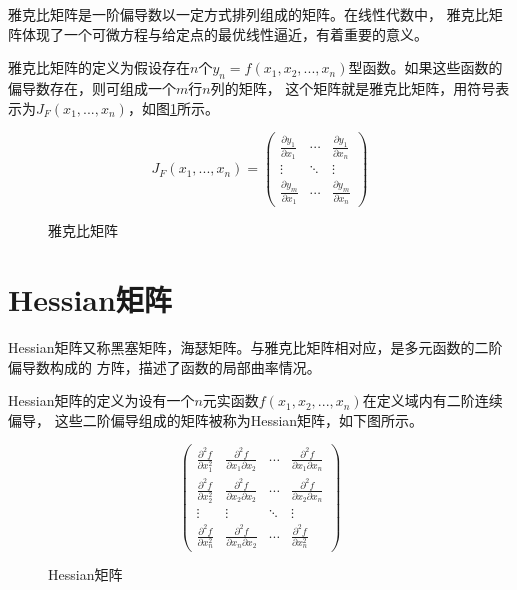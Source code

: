 雅克比矩阵是一阶偏导数以一定方式排列组成的矩阵。在线性代数中，
雅克比矩阵体现了一个可微方程与给定点的最优线性逼近，有着重要的意义。

雅克比矩阵的定义为假设存在$n$个$y_n=f(x_1,x_2,...,x_n)$型函数。如果这些函数的偏导数存在，则可组成一个$m$行$n$列的矩阵，
这个矩阵就是雅克比矩阵，用符号表示为$J_F(x_1,...,x_n)$，如图\ref{jacobin_matrix}所示。

\begin{figure}[!hb]
	\begin{equation}
		J_F(x_1,...,x_n)=
		\left( \begin{matrix}
			\frac{\partial y_1}{\partial x_1} & \cdots & \frac{\partial y_1}{\partial x_n}\\
			\vdots & \ddots & \vdots\\
			\frac{\partial y_m}{\partial x_1} & \cdots & \frac{\partial y_m}{\partial x_n}
			\end{matrix}
			\right )
	\end{equation}
	\caption{雅克比矩阵}
	\label{jacobin_matrix}
\end{figure}



\section{Hessian矩阵}

Hessian矩阵又称黑塞矩阵，海瑟矩阵。与雅克比矩阵相对应，是多元函数的二阶偏导数构成的
方阵，描述了函数的局部曲率情况。

Hessian矩阵的定义为设有一个$n$元实函数$f(x_1,x_2,...,x_n)$在定义域内有二阶连续偏导，
这些二阶偏导组成的矩阵被称为Hessian矩阵，如下图所示。

\begin{figure}[!ht]
	\begin{equation}
		\left( \begin{matrix}
			\frac{\partial^2 f}{\partial x_1^2} & \frac{\partial^2 f}{\partial x_1 \partial x_2} & \cdots & \frac{\partial^2 f}{\partial x_1 \partial x_n}\\
            \frac{\partial^2 f}{\partial x_2^2} & \frac{\partial^2 f}{\partial x_2 \partial x_2} & \cdots & \frac{\partial^2 f}{\partial x_2 \partial x_n}\\
			\vdots & \vdots & \ddots & \vdots\\
			\frac{\partial^2 f}{\partial x_n^2} & \frac{\partial^2 f}{\partial x_n \partial x_2} & \cdots & \frac{\partial^2 f}{\partial x_n^2}
			\end{matrix}
			\right )
	\end{equation}
	\caption{Hessian矩阵}
\end{figure}


